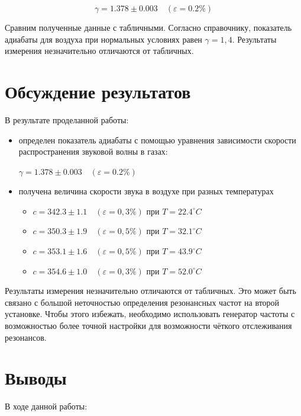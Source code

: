 \documentclass{article}
\begin{document}
\[ \boxed{\gamma = 1.378 \pm 0.003}\quad (\varepsilon=0.2\%) \]

Сравним полученные данные с табличными. Согласно справочнику, показатель адиабаты для воздуха при нормальных условиях равен \underline{$ \gamma = 1,4 $}. Результаты измерения незначительно отличаются от табличных.

\section*{Обсуждение результатов}

В результате проделанной работы:

\begin{itemize}
\item определен показатель адиабаты с помощью уравнения зависимости скорости распространения звуковой волны в газах:

$ \gamma = 1.378 \pm 0.003\quad (\varepsilon=0.2\%) $
\item получена величина скорости звука в воздухе при разных температурах
\begin{itemize}
\item $ c = 342.3 \pm 1.1\quad (\varepsilon=0,3\%) $ при $ T = 22.4^{\circ}C $
\item $ c = 350.3 \pm 1.9\quad (\varepsilon=0,5\%) $ при $ T = 32.1^{\circ}C $
\item $ c = 353.1 \pm 1.6\quad (\varepsilon=0,5\%) $ при $ T = 43.9^{\circ}C $
\item $ c = 354.6 \pm 1.0\quad (\varepsilon=0,3\%) $ при $ T = 52.0^{\circ}C $
\end{itemize}

\end{itemize}

Результаты измерения незначительно отличаются от табличных. Это может быть связано с большой неточностью определения резонансных частот на второй установке. Чтобы этого избежать, необходимо использовать генератор частоты с возможностью более точной настройки для возможности чёткого отслеживания резонансов.

\section*{Выводы}

В ходе данной работы:
\end{document}
